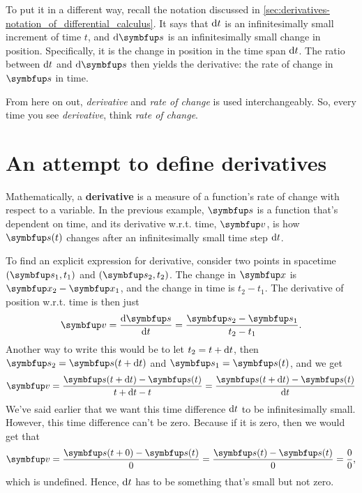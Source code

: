 To put it in a different way, recall the notation discussed in \cref{sec:derivatives-notation_of_differential_calculus}. It says that \(\odif{t}\) is an infinitesimally small increment of time \(t\), and \(\odif{\vv{s}}\) is an infinitesimally small change in position. Specifically, it is the change in position in the time span \(\odif{t}\). The ratio between \(\odif{t}\) and \(\odif{\vv{s}}\) then yields the derivative: the rate of change in \(\vv{s}\) in time.

From here on out, \emph{derivative} and \emph{rate of change} is used interchangeably. So, every time you see \emph{derivative}, think \emph{rate of change}.

\section{An attempt to define derivatives}

Mathematically, a \textbf{derivative} is a measure of a function's rate of change with respect to a variable. In the previous example, \(\vv{s}\) is a function that's dependent on time, and its derivative w.r.t. time, \(\vv{v}\), is how \(\vv{s}(t)\) changes after an infinitesimally small time step \(\odif{t}\).

To find an explicit expression for derivative, consider two points in spacetime \((\vv{s}_1, t_1)\) and \((\vv{s}_2, t_2)\). The change in \(\vv{x}\) is \(\vv{x}_2 - \vv{x}_1\), and the change in time is \(t_2 - t_1\). The derivative of position w.r.t. time is then just
\begin{equation}
  \vv{v} = \odv{\vv{s}}{t} = \frac{\vv{s}_2 - \vv{s}_1}{t_2 - t_1}. \label{eq:derivative1}
\end{equation}
Another way to write this would be to let \(t_2 = t + \odif{t}\), then \(\vv{s}_2 = \vv{s}(t + \odif{t})\) and \(\vv{s}_1 = \vv{s}(t)\), and we get
\begin{equation}
  \vv{v} = \frac{\vv{s}(t + \odif{t}) - \vv{s}(t)}{t + \odif{t} - t} = \frac{\vv{s}(t + \odif{t}) - \vv{s}(t)}{\odif{t}}
\end{equation}
We've said earlier that we want this time difference \(\odif{t}\) to be infinitesimally small. However, this time difference can't be zero. Because if it is zero, then we would get that
\begin{equation}
  \vv{v} = \frac{\vv{s}(t + 0) - \vv{s}(t)}{0} = \frac{\vv{s}(t) - \vv{s}(t)}{0} = \frac{0}{0},
\end{equation}
which is undefined. Hence, \(\odif{t}\) has to be something that's small but not zero.

